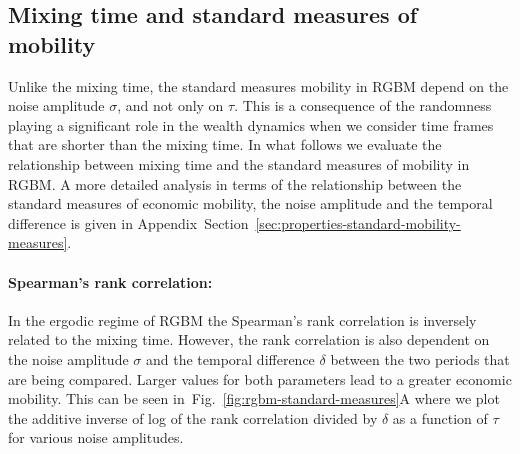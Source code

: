 \documentclass[11pt]{article}
\newcommand{\Sref}[1]{Section~\ref{sec:#1}}
\newcommand{\fref}[1]{Fig.~\ref{fig:#1}}
\newcommand{\Fref}[1]{Figure~\ref{fig:#1}}
\numberwithin{equation}{section}
\begin{document}

\subsection{Mixing time and standard measures of mobility}\label{sec:measures}

Unlike the mixing time, the standard measures mobility in RGBM depend on the noise amplitude $\sigma$, and not only on $\tau$. This is a consequence of the randomness playing a significant role in the wealth dynamics when we consider time frames that are shorter than the mixing time. In what follows we evaluate the relationship between mixing time and the standard measures of mobility in RGBM. A more detailed analysis in terms of the relationship between the standard measures of economic mobility, the noise amplitude and the temporal difference is given in Appendix~\Sref{properties-standard-mobility-measures}.

\paragraph{Spearman's rank correlation:} In the ergodic regime of RGBM the Spearman's rank correlation is inversely related to the mixing time. However, the rank correlation is also dependent on the noise amplitude $\sigma$ and the temporal difference $\delta$ between the two periods that are being compared. Larger values for both parameters lead to a greater economic mobility. This can be seen in~\fref{rgbm-standard-measures}A where we plot the additive inverse of log of the rank correlation divided by $\delta$ as a function of $\tau$ for various noise amplitudes.
\end{document}
